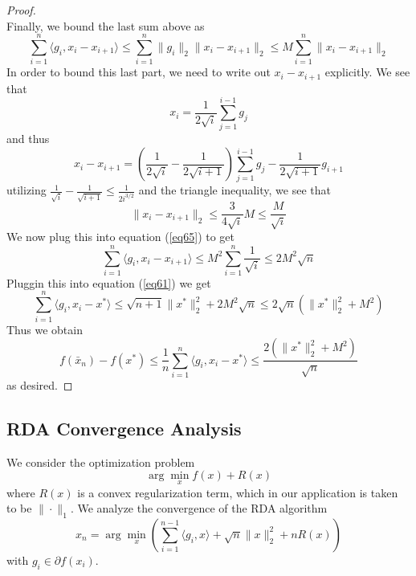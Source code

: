 \begin{proof}
\begin{equation}
\end{equation}
Finally, we bound the last sum above as
\begin{equation}\label{eq65}
    \displaystyle\sum_{i=1}^n\langle g_i, x_i - x_{i+1}\rangle \leq \displaystyle\sum_{i=1}^n \|g_i\|_2\|x_i - x_{i+1}\|_2 \leq M\displaystyle\sum_{i=1}^n\|x_i - x_{i+1}\|_2
\end{equation}
In order to bound this last part, we need to write out $x_i - x_{i+1}$ explicitly. We see that
$$ x_i = \frac{1}{2\sqrt{i}}\displaystyle\sum_{j = 1}^{i-1} g_j
$$
and thus
$$ x_i - x_{i+1} = \left(\frac{1}{2\sqrt{i}} - \frac{1}{2\sqrt{i+1}}\right)\displaystyle\sum_{j = 1}^{i-1} g_j - \frac{1}{2\sqrt{i+1}} g_{i+1}
$$
utilizing $\frac{1}{\sqrt{i}} - \frac{1}{\sqrt{i+1}} \leq \frac{1}{2i^{3/2}}$ and the triangle inequality, we see that
\begin{equation}
    \|x_i - x_{i+1}\|_2 \leq \frac{3}{4\sqrt{i}}M \leq \frac{M}{\sqrt{i}}
\end{equation}
We now plug this into equation (\ref{eq65}) to get
\begin{equation}
    \displaystyle\sum_{i=1}^n\langle g_i, x_i - x_{i+1}\rangle \leq  M^2 \displaystyle\sum_{i=1}^n \frac{1}{\sqrt{i}} \leq 2M^2 \sqrt{n}
\end{equation}
Pluggin this into equation (\ref{eq61}) we get
\begin{equation}
    \displaystyle\sum_{i = 1}^n \langle g_i, x_i - x^*\rangle \leq \sqrt{n+1}\|x^*\|_2^2 + 2M^2 \sqrt{n} \leq 2\sqrt{n}(\|x^*\|_2^2 + M^2)
\end{equation}
Thus we obtain
\begin{equation}
     f(\bar{x}_n) - f(x^*) \leq \frac{1}{n}\displaystyle\sum_{i = 1}^n \langle g_i, x_i - x^*\rangle \leq \frac{2(\|x^*\|_2^2 + M^2)}{\sqrt{n}}
\end{equation}
as desired.
\end{proof}

\subsection{RDA Convergence Analysis}
We consider the optimization problem
\begin{equation}
    \arg\min_x f(x) + R(x)
\end{equation}
where $R(x)$ is a convex regularization term, which in our application is taken to be $\|\cdot\|_1$. We analyze the convergence of the RDA algorithm
\begin{equation}\label{RDA_iteration}
    x_n = \arg\min_x \left(\displaystyle\sum_{i = 1}^{n-1} \langle g_i, x\rangle + \sqrt{n}\|x\|_2^2 + nR(x)\right)
\end{equation}
with $g_i\in \partial f(x_i)$.

